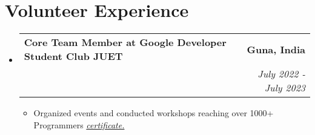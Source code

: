 \documentclass[letterpaper,11pt]{article}
\makeatletter
\newcommand{\resumeItem}[1]{
  \item\small{
	{#1 \vspace{-2pt}}
  }
}
\newcommand{\resumeSubheading}[4]{
  \vspace{-2pt}\item
	\begin{tabular*}{1.0\textwidth}[t]{l@{\extracolsep{\fill}}r}
  	\textbf{#1} & \textbf{\small #2} \\
  	\textit{\small#3} & \textit{\small #4} \\
	\end{tabular*}\vspace{-7pt}
}
\newcommand{\resumeSubHeadingListStart}{\begin{itemize}[leftmargin=0.0in, label={}]}
\newcommand{\resumeSubHeadingListEnd}{\end{itemize}}
\newcommand{\resumeItemListStart}{\begin{itemize}}
\newcommand{\resumeItemListEnd}{\end{itemize}\vspace{-5pt}}
\makeatother
\begin{document}
  

\section{Volunteer Experience}
  \resumeSubHeadingListStart
	\resumeSubheading 
  	{Core Team Member at Google Developer Student Club JUET}{Guna, India}
    {}{July 2022 - July 2023}
  	\resumeItemListStart
      \vspace{-12pt}
    	\resumeItem{Organized events and conducted workshops reaching over 1000+  Programmers {\href{https://drive.google.com/file/d/16ciNXQLWNNuhST4ud0wVfPa3oEdIm71R/view?usp=sharing}{\color{blue} \textit{certificate.}}}} 
	\resumeItemListEnd
    
  \resumeSubHeadingListEnd
\vspace{-11pt}




 


 













 
\end{document}
